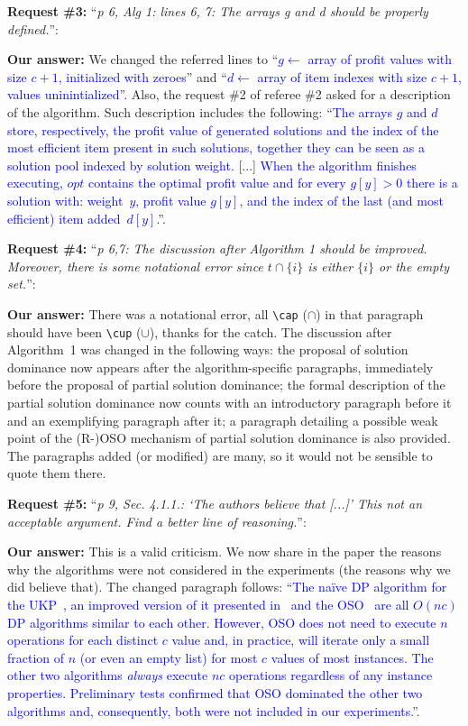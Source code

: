 \documentclass{elsarticle}
\begin{document}
\textbf{Request \#3:} ``\textit{p 6, Alg 1: lines 6, 7: The arrays g and d should be properly defined.}'':

\textbf{Our answer:} We changed the referred lines to ``\textcolor{blue}{\(g \leftarrow\) array of profit values with size \(c + 1\), initialized with zeroes}'' and ``\textcolor{blue}{\(d \leftarrow\) array of item indexes with size \(c + 1\), values uninintialized}''.
Also, the request \#2 of referee \#2 asked for a description of the algorithm.
Such description includes the following: ``\textcolor{blue}{The arrays \(g\) and \(d\) store, respectively, the profit value of generated solutions and the index of the most efficient item present in such solutions, together they can be seen as a solution pool indexed by solution weight.} [...] \textcolor{blue}{When the algorithm finishes executing, \(opt\) contains the optimal profit value and for every \(g[y] > 0\) there is a solution with: weight~\(y\), profit value \(g[y]\), and the index of the last (and most efficient) item added~\(d[y]\).}''.
\medskip

\textbf{Request \#4:} ``\textit{p 6,7: The discussion after Algorithm 1 should be improved. Moreover, there is some notational error since \(t \cap \{i\}\)  is either \(\{i\}\) or the empty set.}'':

\textbf{Our answer:} There was a notational error, all \verb+\cap+ (\(\cap\)) in that paragraph should have been \verb+\cup+ (\(\cup\)), thanks for the catch. The discussion after Algorithm~1 was changed in the following ways: the proposal of solution dominance now appears after the algorithm-specific paragraphs, immediately before the proposal of partial solution dominance; the formal description of the partial solution dominance now counts with an introductory paragraph before it and an exemplifying paragraph after it; a paragraph detailing a possible weak point of the (R-)OSO mechanism of partial solution dominance is also provided. The paragraphs added (or modified) are many, so it would not be sensible to quote them there.
\medskip

\textbf{Request \#5:} ``\textit{p 9, Sec. 4.1.1.: `The authors believe that [...]' This not an acceptable argument. Find a better line of reasoning.}'':

\textbf{Our answer:} This is a valid criticism.
We now share in the paper the reasons why the algorithms were not considered in the experiments (the reasons why we did believe that).
The changed paragraph follows: ``\textcolor{blue}{The naïve DP algorithm for the UKP~\cite[p.~311]{tchu}, an improved version of it presented in~\cite[p.~221]{garfinkel} and the OSO~\cite[p.~15]{gg-66} are all \(O(nc)\) DP algorithms similar to each other. %
However, OSO does not need to execute \(n\) operations for each distinct \(c\) value and, in practice, will iterate only a small fraction of \(n\) (or even an empty list) for most \(c\) values of most instances.
The other two algorithms \emph{always} execute \(nc\) operations regardless of any instance properties.
Preliminary tests confirmed that OSO dominated the other two algorithms and, consequently, both were not included in our experiments.}''.
\medskip
\end{document}

